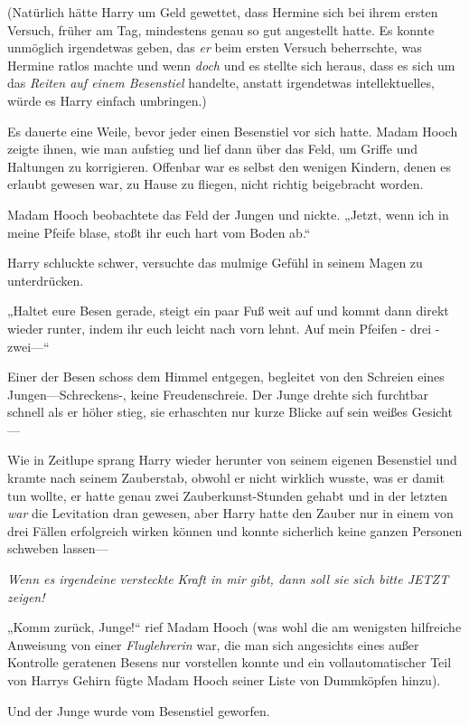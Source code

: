{(Natürlich hätte Harry um Geld gewettet, dass Hermine sich bei ihrem ersten Versuch, früher am Tag, mindestens genau so gut angestellt hatte. Es konnte unmöglich irgendetwas geben, das \emph{er} beim ersten Versuch beherrschte, was Hermine ratlos machte und wenn \emph{doch} und es stellte sich heraus, dass es sich um das \emph{Reiten auf einem Besenstiel} handelte, anstatt irgendetwas intellektuelles, würde es Harry einfach umbringen.)

Es dauerte eine Weile, bevor jeder einen Besenstiel vor sich hatte. Madam Hooch zeigte ihnen, wie man aufstieg und lief dann über das Feld, um Griffe und Haltungen zu korrigieren. Offenbar war es selbst den wenigen Kindern, denen es erlaubt gewesen war, zu Hause zu fliegen, nicht richtig beigebracht worden.

Madam Hooch beobachtete das Feld der Jungen und nickte. „Jetzt, wenn ich in meine Pfeife blase, stoßt ihr euch hart vom Boden ab.“

Harry schluckte schwer, versuchte das mulmige Gefühl in seinem Magen zu unterdrücken.

„Haltet eure Besen gerade, steigt ein paar Fuß weit auf und kommt dann direkt wieder runter, indem ihr euch leicht nach vorn lehnt. Auf mein Pfeifen - drei - zwei—“

Einer der Besen schoss dem Himmel entgegen, begleitet von den Schreien eines Jungen—Schreckens-, keine Freudenschreie. Der Junge drehte sich furchtbar schnell als er höher stieg, sie erhaschten nur kurze Blicke auf sein weißes Gesicht—

Wie in Zeitlupe sprang Harry wieder herunter von seinem eigenen Besenstiel und kramte nach seinem Zauberstab, obwohl er nicht wirklich wusste, was er damit tun wollte, er hatte genau zwei Zauberkunst-Stunden gehabt und in der letzten \emph{war} die Levitation dran gewesen, aber Harry hatte den Zauber nur in einem von drei Fällen erfolgreich wirken können und konnte sicherlich keine ganzen Personen schweben lassen—

\emph{Wenn es irgendeine versteckte Kraft in mir gibt, dann soll sie sich bitte JETZT zeigen!}

„Komm zurück, Junge!“ rief Madam Hooch (was wohl die am wenigsten hilfreiche Anweisung von einer \emph{Fluglehrerin} war, die man sich angesichts eines außer Kontrolle geratenen Besens nur vorstellen konnte und ein vollautomatischer Teil von Harrys Gehirn fügte Madam Hooch seiner Liste von Dummköpfen hinzu).

Und der Junge wurde vom Besenstiel geworfen.

}
